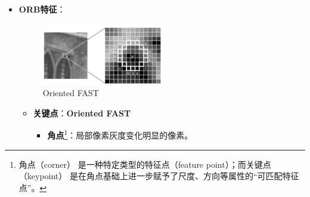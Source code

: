 \documentclass[../main.tex]{subfiles}
\begin{document}
\begin{enumerate}
\begin{itemize}
\begin{enumerate}
\begin{itemize}
\begin{enumerate}
\begin{itemize}
                                        \end{itemize}
                                    \item \textbf{特征点描述}：
                                    \begin{itemize}
                                        \item \textbf{关键点(Key-point)}：描述特征在图像中的\textbf{位置}等信息
                                        \item \textbf{描述子(Descriptor)}：描述该关键点与\textbf{邻域}在\textbf{亮度、颜色、纹理}等方面的图像模式
                                    \end{itemize}
                                    \item \textbf{特征特性}：可重复性\footnote{即大量特征应在下一幅图像中出现}、不变性\footnote{光照不变性、几何不变性（旋转、尺度、视点）}、独特性、鲁棒性\footnote{适应噪声、压缩、模糊}、定位准确性\footnote{包括位置和尺度}、计算效率高
                                \end{enumerate}
                            \item \textbf{ORB特征}：
                                                \begin{figure}[H]
                                                    \centering
                                                    \includegraphics[width=0.5\textwidth]{images/orb1.png}
                                                    \caption{Oriented FAST}
                                                \end{figure}
                                \begin{itemize}
                                    \item \textbf{关键点}：\textbf{Oriented FAST} 
                                        \begin{itemize}
                                            \item \textbf{角点}\footnote{角点（corner） 是一种特定类型的特征点（feature point）；而关键点（keypoint） 是在角点基础上进一步赋予了尺度、方向等属性的“可匹配特征点”。}：局部像素灰度变化明显的像素。

\end{itemize}
\end{itemize}
\end{itemize}
\end{enumerate}
\end{itemize}
\end{enumerate}
\end{document}
